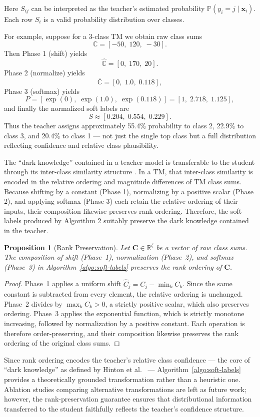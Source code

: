 \documentclass[sn-mathphys-num]{sn-jnl}%
\theoremstyle{thmstyleone}%
\newtheorem{proposition}[theorem]{Proposition}%
\theoremstyle{thmstyletwo}%
\theoremstyle{thmstylethree}%
\begin{document}
Here $S_{ij}$ can be interpreted as the teacher’s estimated probability $\mathbb{P}(y_i = j \mid \mathbf{x}_i)$. Each row $S_i$ is a valid probability distribution over classes. 

For example, suppose for a 3-class TM we obtain raw class sums  
\[
\mathbb{C} = [-50,\;120,\;-30].
\]  
Then Phase 1 (shift) yields  
\[
\hat{\mathbb{C}} = [0,\;170,\;20].
\]  
Phase 2 (normalize) yields  
\[
\bar{\mathbb{C}} = [0,\;1.0,\;0.118],
\]  
Phase 3 (softmax) yields  
\[
P = [\exp(0),\;\exp(1.0),\;\exp(0.118)] = [1,\;2.718,\;1.125],
\]  
and finally the normalized soft labels are  
\[
S \approx [0.204,\;0.554,\;0.229].
\]  
Thus the teacher assigns approximately 55.4\% probability to class 2, 22.9\% to class 3, and 20.4\% to class 1 — not just the single top class but a full distribution reflecting confidence and relative class plausibility.

The ``dark knowledge'' contained in a teacher model is transferable to the student through its inter-class similarity structure \cite{hinton2015distillingknowledgeneuralnetwork}. In a TM, that inter-class similarity is encoded in the relative ordering and magnitude differences of TM class sums. Because shifting by a constant (Phase 1), normalizing by a positive scalar (Phase 2), and applying softmax (Phase 3) each retain the relative ordering of their inputs, their composition likewise preserves rank ordering. Therefore, the soft labels produced by Algorithm 2 suitably preserve the dark knowledge contained in the teacher.

\begin{proposition}[Rank Preservation]
	Let $\mathbf{C} \in \mathbb{R}^\zeta$ be a vector of raw class sums. The composition
	of shift (Phase~1), normalization (Phase~2), and softmax (Phase~3) in
	Algorithm~\ref{algo:soft-labels} preserves the rank ordering of $\mathbf{C}$.
\end{proposition}
\begin{proof}
	Phase~1 applies a uniform shift $\hat{C}_j = C_j - \min_k C_k$. Since the same
	constant is subtracted from every element, the relative ordering is unchanged.
	Phase~2 divides by $\max_k \hat{C}_k > 0$, a strictly positive scalar, which
	also preserves ordering. Phase~3 applies the exponential function, which is
	strictly monotone increasing, followed by normalization by a positive constant.
	Each operation is therefore order-preserving, and their composition likewise
	preserves the rank ordering of the original class sums.
\end{proof}
Since rank ordering encodes the teacher's relative class confidence --- the core of
``dark knowledge'' as defined by Hinton et al.~\cite{hinton2015distillingknowledgeneuralnetwork} --- Algorithm~\ref{algo:soft-labels} provides a theoretically grounded transformation rather than a heuristic one.
Ablation studies comparing alternative transformations are left as future work;
however, the rank-preservation guarantee ensures that distributional information
transferred to the student faithfully reflects the teacher's confidence structure.
\end{document}
